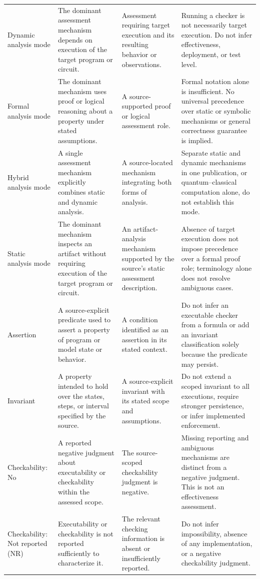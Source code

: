 \begin{longtable}{@{}p{.15\linewidth}p{.27\linewidth}p{.25\linewidth}p{.27\linewidth}@{}}
Dynamic analysis mode & The dominant assessment mechanism depends on execution of the target program or circuit. & Assessment requiring target execution and its resulting behavior or observations. & Running a checker is not necessarily target execution. Do not infer effectiveness, deployment, or test level.\\
Formal analysis mode & The dominant mechanism uses proof or logical reasoning about a property under stated assumptions. & A source-supported proof or logical assessment role. & Formal notation alone is insufficient. No universal precedence over static or symbolic mechanisms or general correctness guarantee is implied.\\
Hybrid analysis mode & A single assessment mechanism explicitly combines static and dynamic analysis. & A source-located mechanism integrating both forms of analysis. & Separate static and dynamic mechanisms in one publication, or quantum--classical computation alone, do not establish this mode.\\
Static analysis mode & The dominant mechanism inspects an artifact without requiring execution of the target program or circuit. & An artifact-analysis mechanism supported by the source's static assessment description. & Absence of target execution does not impose precedence over a formal proof role; terminology alone does not resolve ambiguous cases.\\
Assertion & A source-explicit predicate used to assert a property of program or model state or behavior. & A condition identified as an assertion in its stated context. & Do not infer an executable checker from a formula or add an invariant classification solely because the predicate may persist.\\
Invariant & A property intended to hold over the states, steps, or interval specified by the source. & A source-explicit invariant with its stated scope and assumptions. & Do not extend a scoped invariant to all executions, require stronger persistence, or infer implemented enforcement.\\
Checkability: No & A reported negative judgment about executability or checkability within the assessed scope. & The source-scoped checkability judgment is negative. & Missing reporting and ambiguous mechanisms are distinct from a negative judgment. This is not an effectiveness assessment.\\
Checkability: Not reported (NR) & Executability or checkability is not reported sufficiently to characterize it. & The relevant checking information is absent or insufficiently reported. & Do not infer impossibility, absence of any implementation, or a negative checkability judgment.\\

\end{longtable}
